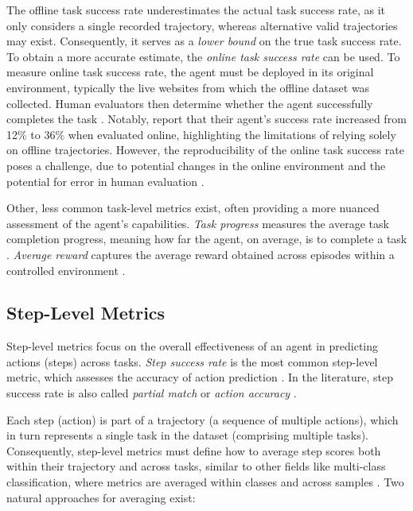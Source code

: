 The offline task success rate underestimates the actual task success rate, as it only considers a single recorded trajectory, whereas alternative valid trajectories may exist. Consequently, it serves as a \emph{lower bound} on the true task success rate.
To obtain a more accurate estimate, the \emph{online task success rate} can be used. To measure online task success rate, the agent must be deployed in its original environment, typically the live websites from which the offline dataset was collected. 
Human evaluators then determine whether the agent successfully completes the task \citep{zheng_gpt-4vision_2024, song_restgpt_2023, li_sugilite_2017}. Notably, \citet{zheng_gpt-4vision_2024} report that their agent's success rate increased from 12\% to 36\% when evaluated online, highlighting the limitations of relying solely on offline trajectories.
However, the reproducibility of the online task success rate poses a challenge, due to potential changes in the online environment and the potential for error in human evaluation \citep{reason1990human}.

Other, less common task-level metrics exist, often providing a more nuanced assessment of the agent's capabilities.
\emph{Task progress} measures the average task completion progress, meaning how far the agent, on average, is to complete a task .
\emph{Average reward} captures the average reward obtained across episodes within a controlled environment . 

\subsection{Step-Level Metrics}

Step-level metrics focus on the overall effectiveness of an agent in predicting actions (steps) across tasks.
\emph{Step success rate} is the most common step-level metric, which assesses the accuracy of action prediction .
In the literature, step success rate is also called \emph{partial match}  or \emph{action accuracy} .

Each step (action) is part of a trajectory (a sequence of multiple actions), which in turn represents a single task in the dataset (comprising multiple tasks). Consequently, step-level metrics must define how to average step scores both within their trajectory and across tasks, similar to other fields like multi-class classification, where metrics are averaged within classes and across samples \citep{grandini2020metrics}.
Two natural approaches for averaging exist:

